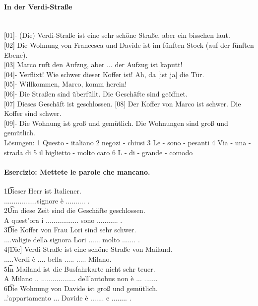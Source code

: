 \documentclass{article}
\begin{document}
\paragraph{In der Verdi-Straße}\\

{[01]}- (Die) Verdi-Straße ist eine sehr schöne Straße, aber ein bisschen laut.\\
{[02]} Die Wohnung von Francesca und Davide ist im fünften Stock (auf der
fünften Ebene).\\
{[03]} Marco ruft den Aufzug, aber ... der Aufzug ist kaputt!\\
{[04]}- Verflixt! Wie schwer dieser Koffer ist! Ah, da [ist ja] die Tür.\\
{[05]}- Willkommen, Marco, komm herein!\\
{[06]}- Die Straßen sind überfüllt. Die Geschäfte sind geöffnet.\\
{[07]} Dieses Geschäft ist geschlossen.
{[08]} Der Koffer von Marco ist schwer. Die Koffer sind schwer.\\
{[09]}- Die Wohnung ist groß und gemütlich. Die Wohnungen sind groß und
gemütlich.\\

Lösungen: 1 Questo - italiano 2 negozi - chiusi 3 Le - sono - pesanti 4 Via -
 una - strada di 5 il biglietto - molto caro 6 L - di - grande - comodo

\paragraph{Esercizio: Mettete le parole che mancano.}


1\t Dieser Herr ist Italiener.\\
.................signore è .......... .\\
2\t Um diese Zeit sind die Geschäfte geschlossen.\\
A quest'ora i ................. sono ........... .\\
3\t Die Koffer von Frau Lori sind sehr schwer.\\
....valigie della signora Lori ...... molto ....... .\\
4\t [Die] Verdi-Straße ist eine schöne Straße von Mailand.\\
.....Verdi è .... bella ..... ..... Milano.\\
5\t In Mailand ist die Busfahrkarte nicht sehr teuer.\\
A Milano .. .................. dell'autobus non è ... .......\\
6\t Die Wohnung von Davide ist groß und gemütlich.\\
..'appartamento ... Davide è ....... e ........ .\\
\end{document}

